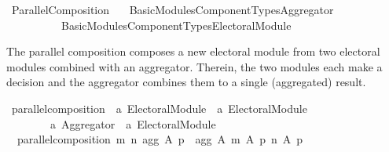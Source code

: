 %
\begin{isabellebody}%
%
%
\isadelimdocument
\isanewline
%
\endisadelimdocument
%
\isatagdocument
\isanewline
\isanewline
%
\isamarkuptrue%
%
\endisatagdocument
{\isafolddocument}%
%
\isadelimdocument
%
\endisadelimdocument
%
\isadelimtheory
%
\endisadelimtheory
%
\isatagtheory
{}\isamarkupfalse%
\ Parallel{\isacharunderscore}{\kern0pt}Composition\isanewline
\ \ \ {\isachardoublequoteopen}Basic{\isacharunderscore}{\kern0pt}Modules{\isacharslash}{\kern0pt}Component{\isacharunderscore}{\kern0pt}Types{\isacharslash}{\kern0pt}Aggregator{\isachardoublequoteclose}\isanewline
\ \ \ \ \ \ \ \ \ \ {\isachardoublequoteopen}Basic{\isacharunderscore}{\kern0pt}Modules{\isacharslash}{\kern0pt}Component{\isacharunderscore}{\kern0pt}Types{\isacharslash}{\kern0pt}Electoral{\isacharunderscore}{\kern0pt}Module{\isachardoublequoteclose}\isanewline
{}%
\endisatagtheory
{\isafoldtheory}%
%
\isadelimtheory
%
\endisadelimtheory
%
\begin{isamarkuptext}%
The parallel composition composes a new electoral module from
two electoral modules combined with an aggregator.
Therein, the two modules each make a decision and the aggregator combines
them to a single (aggregated) result.%
\end{isamarkuptext}\isamarkuptrue%
%
\isadelimdocument
%
\endisadelimdocument
%
\isatagdocument
%
\isamarkuptrue%
%
\endisatagdocument
{\isafolddocument}%
%
\isadelimdocument
%
\endisadelimdocument
{}\isamarkupfalse%
\ parallel{\isacharunderscore}{\kern0pt}composition\ {\isacharcolon}{\kern0pt}{\isacharcolon}{\kern0pt}\ {\isachardoublequoteopen}{\isacharprime}{\kern0pt}a\ Electoral{\isacharunderscore}{\kern0pt}Module\ {\isasymRightarrow}\ {\isacharprime}{\kern0pt}a\ Electoral{\isacharunderscore}{\kern0pt}Module\ {\isasymRightarrow}\isanewline
\ \ \ \ \ \ \ \ {\isacharprime}{\kern0pt}a\ Aggregator\ {\isasymRightarrow}\ {\isacharprime}{\kern0pt}a\ Electoral{\isacharunderscore}{\kern0pt}Module{\isachardoublequoteclose}\ \isanewline
\ \ {\isachardoublequoteopen}parallel{\isacharunderscore}{\kern0pt}composition\ m\ n\ agg\ A\ p\ {\isacharequal}{\kern0pt}\ agg\ A\ {\isacharparenleft}{\kern0pt}m\ A\ p{\isacharparenright}{\kern0pt}\ {\isacharparenleft}{\kern0pt}n\ A\ p{\isacharparenright}{\kern0pt}{\isachardoublequoteclose}\isanewline
\isanewline
{}\isamarkupfalse%

\end{isabellebody}
